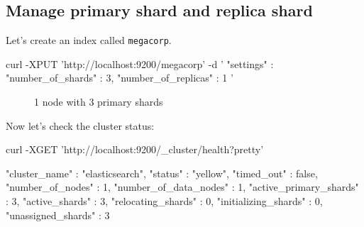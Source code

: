 \documentclass[]{beamer}
\begin{document}
\subsection{Manage primary shard and replica shard}

\begin{frame}[containsverbatim]{\subsecname{}}
  Let’s create an index called \texttt{megacorp}.

  \begin{command}
curl -XPUT 'http://localhost:9200/megacorp' -d '
{
  "settings" : {
    "number_of_shards" : 3,
    "number_of_replicas" : 1
  }
}'
  \end{command}

  \begin{figure}[h!]
    \centering
    \caption{1 node with 3 primary shards}
  \end{figure}
\end{frame}

\begin{frame}[containsverbatim]{\subsecname{}}
  Now let's check the cluster status:

  \begin{command}
curl -XGET 'http://localhost:9200/_cluster/health?pretty'
  \end{command}
  
  \begin{command}
{
  "cluster_name" : "elasticsearch",
  "status" : "yellow",
  "timed_out" : false,
  "number_of_nodes" : 1,
  "number_of_data_nodes" : 1,
  "active_primary_shards" : 3,
  "active_shards" : 3,
  "relocating_shards" : 0,
  "initializing_shards" : 0,
  "unassigned_shards" : 3
}
  \end{command}
\end{frame}
\end{document}
